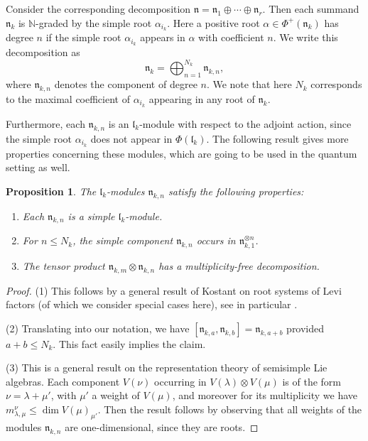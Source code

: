\documentclass[a4paper, 12pt, reqno, english]{amsart}
\numberwithin{equation}{section}
\numberwithin{figure}{section}
\theoremstyle{plain}
\theoremstyle{plain}
\theoremstyle{plain}
\newtheorem{proposition}[theorem]{Proposition}
\theoremstyle{plain}
\theoremstyle{plain}
\theoremstyle{definition}
\theoremstyle{definition}
\theoremstyle{definition}
\theoremstyle{remark}
\theoremstyle{definition}
\theoremstyle{definition}
\newcommand{\bbN}{\mathbb{N}}
\newcommand{\liel}{\mathfrak{l}}
\newcommand{\lien}{\mathfrak{n}}
\newcommand{\roots}{\Phi}
\begin{document}
Consider the corresponding decomposition $\lien = \lien_1 \oplus \cdots \oplus \lien_r$.
Then each summand $\lien_k$ is $\bbN$-graded by the simple root $\alpha_{i_k}$. Here a positive root $\alpha \in \roots^+(\lien_k)$ has degree $n$ if the simple root $\alpha_{i_k}$ appears in $\alpha$ with coefficient $n$.
We write this decomposition as
\[
\lien_k = \bigoplus_{n = 1}^{N_k} \lien_{k, n},
\]
where $\lien_{k, n}$ denotes the component of degree $n$.
We note that here $N_k$ corresponds to the maximal coefficient of $\alpha_{i_k}$ appearing in any root of $\lien_k$.

Furthermore, each $\lien_{k, n}$ is an $\liel_k$-module with respect to the adjoint action, since the simple root $\alpha_{i_k}$ does not appear in $\roots(\liel_k)$.
The following result gives more properties concerning these modules, which are going to be used in the quantum setting as well.

\begin{proposition}
\label{prop:classical-module}
The $\liel_k$-modules $\lien_{k, n}$ satisfy the following properties:
\begin{enumerate}
\item Each $\lien_{k, n}$ is a simple $\liel_k$-module.
\item For $n \leq N_k$, the simple component $\lien_{k, n}$ occurs in $\lien_{k, 1}^{\otimes n}$.
\item The tensor product $\lien_{k, m} \otimes \lien_{k, n}$ has a multiplicity-free decomposition.
\end{enumerate}
\end{proposition}

\begin{proof}
(1) This follows by a general result of Kostant on root systems of Levi factors (of which we consider special cases here), see in particular \cite[Theorem 1.9]{kostant}.

(2) Translating \cite[Theorem 2.3]{kostant} into our notation, we have $[\lien_{k, a}, \lien_{k, b}] = \lien_{k, a + b}$ provided $a + b \leq N_k$. This fact easily implies the claim.

(3) This is a general result on the representation theory of semisimple Lie algebras.
Each component $V(\nu)$ occurring in $V(\lambda) \otimes V(\mu)$ is of the form $\nu = \lambda + \mu'$, with $\mu'$ a weight of $V(\mu)$, and moreover for its multiplicity we have $m^\nu_{\lambda, \mu} \leq \dim V(\mu)_{\mu'}$.
Then the result follows by observing that all weights of the modules $\lien_{k, n}$ are one-dimensional, since they are roots.
\end{proof}
\end{document}
